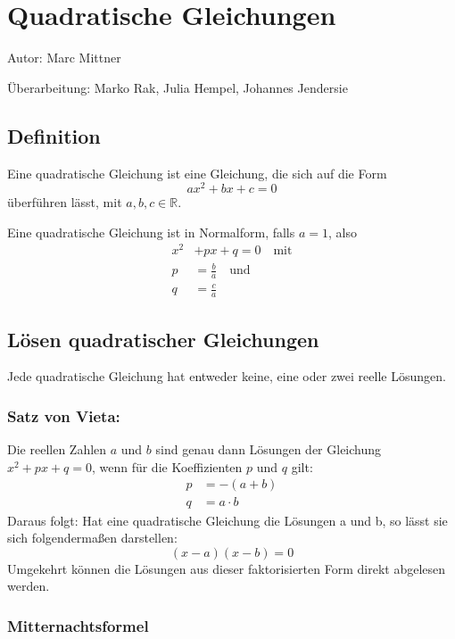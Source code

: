 \chapter{Quadratische Gleichungen}
	
	Autor: Marc Mittner
	
\noindent	\"Uberarbeitung: Marko Rak, Julia Hempel, Johannes Jendersie
	
	\section{Definition}
		
		Eine quadratische Gleichung ist eine Gleichung, die sich auf die Form 
		\[ ax^2 +bx+c=0 \]
		überführen lässt, mit  $ a, b, c \in \mathbb{R} $.
		
		Eine quadratische Gleichung ist in Normalform, falls $a = 1 $, also
        \begin{align*}
          x^2 &+ px + q=0 \quad\text{mit}\\
          p &= \frac b a \quad\text{und}\\
          q &= \frac c a
        \end{align*}
      
		
	\section{Lösen quadratischer Gleichungen}
		
		Jede quadratische Gleichung hat entweder keine, eine oder zwei reelle Lösungen.
	
		\subsection{Satz von Vieta:}
		Die reellen Zahlen $ a $ und $ b $ sind genau dann Lösungen der Gleichung 
		$x^2 + px + q = 0$, wenn für die Koeffizienten $ p $ und $ q $ gilt:
        \begin{align*}
            p &= -( a + b) \\
            q &= a \cdot b
        \end{align*}
		Daraus folgt:
		Hat eine quadratische Gleichung die Lösungen a und b, so lässt sie sich folgendermaßen darstellen:
		\[ (x - a)(x - b) = 0 \]
		Umgekehrt können die Lösungen aus dieser faktorisierten Form direkt abgelesen werden.
	
		\subsection{Mitternachtsformel}
			
